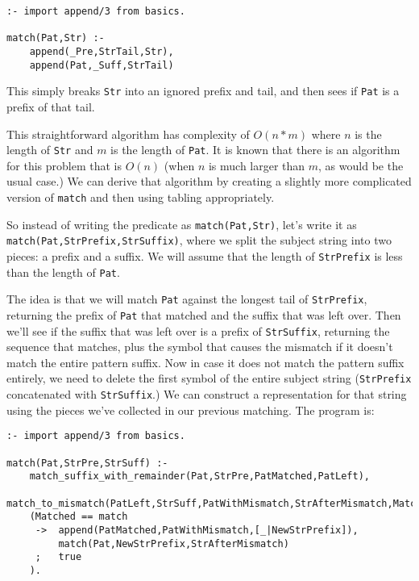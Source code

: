 \begin{verbatim}
:- import append/3 from basics.

match(Pat,Str) :- 
    append(_Pre,StrTail,Str), 
    append(Pat,_Suff,StrTail)
\end{verbatim}

This simply breaks \verb|Str| into an ignored prefix and tail, and
then sees if \verb|Pat| is a prefix of that tail.

This straightforward algorithm has complexity of $O(n*m)$ where $n$ is
the length of \verb|Str| and $m$ is the length of \verb|Pat|.  It is
known that there is an algorithm for this problem that is $O(n)$ (when
$n$ is much larger than $m$, as would be the usual case.)  We can
derive that algorithm by creating a slightly more complicated version
of \verb|match| and then using tabling appropriately.

So instead of writing the predicate as \verb|match(Pat,Str)|, let's
write it as \verb|match(Pat,StrPrefix,StrSuffix)|, where we split the
subject string into two pieces: a prefix and a suffix.  We will assume
that the length of \verb|StrPrefix| is less than the length of
\verb|Pat|.

The idea is that we will match \verb|Pat| against the longest tail of
\verb|StrPrefix|, returning the prefix of \verb|Pat| that matched and
the suffix that was left over.  Then we'll see if the suffix that was
left over is a prefix of \verb|StrSuffix|, returning the sequence that
matches, plus the symbol that causes the mismatch if it doesn't match
the entire pattern suffix.  Now in case it does not match the pattern
suffix entirely, we need to delete the first symbol of the entire
subject string (\verb|StrPrefix| concatenated with \verb|StrSuffix|.)
We can construct a representation for that string using the pieces
we've collected in our previous matching.  The program is:

\begin{verbatim}
:- import append/3 from basics.

match(Pat,StrPre,StrSuff) :-
    match_suffix_with_remainder(Pat,StrPre,PatMatched,PatLeft),
    match_to_mismatch(PatLeft,StrSuff,PatWithMismatch,StrAfterMismatch,Matched),
    (Matched == match
     ->  append(PatMatched,PatWithMismatch,[_|NewStrPrefix]),
         match(Pat,NewStrPrefix,StrAfterMismatch)
     ;   true
    ).
\end{verbatim}

